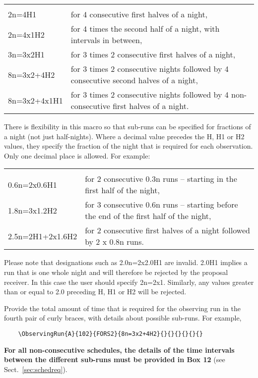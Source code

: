 \documentclass{article}
\begin{document}
\begin{tabular}{ll}
& \\
2n=4H1     & for 4 consecutive first halves of a night, \\
2n=4x1H2   & for 4 times the second half of a night, with intervals in between,\\   
3n=3x2H1  & for 3 times 2 consecutive first halves of a night, \\   
8n=3x2+4H2& for 3 times 2 consecutive nights followed by 4 consecutive second halves of a night, \\
8n=3x2+4x1H1& for 3 times 2 consecutive nights followed by 4 non-consecutive first halves of a night. \\
\end{tabular}

\bigskip

There is flexibility in this macro so that sub-runs
can be specified for fractions of a night  (not just half-nights).
Where a decimal value precedes the H, H1 or H2 values, they specify the
fraction of the night that is required for each observation. Only
one decimal place is allowed.
For example:

\begin{tabular}{ll}
& \\
0.6n=2x0.6H1     & for 2 consecutive 0.3n runs -- starting in the first half of the night, \\
1.8n=3x1.2H2    & for  3 consecutive 0.6n runs -- starting before the end of the first half of the night, \\
2.5n=2H1+2x1.6H2 & for 2 consecutive first halves of a night followed by 2 x 0.8n runs.\\
\end{tabular}

Please note that designations such as 2.0n=2x2.0H1 are invalid. 2.0H1 implies a run that is one whole night and will therefore be rejected by the proposal receiver.
In this case the user should specify 2n=2x1.
Similarly, any values greater than or equal to 2.0 preceding
H, H1 or H2 will be rejected.

\bigskip

Provide the total amount of time
that is required for the observing run in the fourth pair of curly braces, with details about possible sub-runs. For example,

\begin{verbatim}
    \ObservingRun{A}{102}{FORS2}{8n=3x2+4H2}{}{}{}{}{}{}
\end{verbatim}
{\bf For all non-consecutive schedules, the details of the time
  intervals between the different sub-runs must be provided in Box
  12} (see Sect.~\ref{sec:schedreq}). \\
\end{document}
